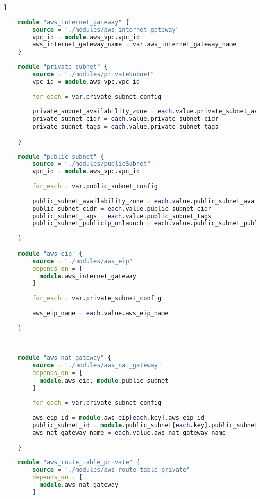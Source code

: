 \begin{lstlisting}[language=terraform]
    }
    
    module "aws_internet_gateway" {
        source = "./modules/aws_internet_gateway"
        vpc_id = module.aws_vpc.vpc_id
        aws_internet_gateway_name = var.aws_internet_gateway_name
    }
    
    module "private_subnet" {
        source = "./modules/privateSubnet"
        vpc_id = module.aws_vpc.vpc_id
    
        for_each = var.private_subnet_config
    
        private_subnet_availability_zone = each.value.private_subnet_availability_zone
        private_subnet_cidr = each.value.private_subnet_cidr
        private_subnet_tags = each.value.private_subnet_tags
      
    }
    
    module "public_subnet" {
        source = "./modules/publicSubnet"
        vpc_id = module.aws_vpc.vpc_id
    
        for_each = var.public_subnet_config
    
        public_subnet_availability_zone = each.value.public_subnet_availability_zone
        public_subnet_cidr = each.value.public_subnet_cidr
        public_subnet_tags = each.value.public_subnet_tags
        public_subnet_publicip_onlaunch = each.value.public_subnet_publicip_onlaunch
      
    }
    
    module "aws_eip" {
        source = "./modules/aws_eip"
        depends_on = [
          module.aws_internet_gateway   
        ]
    
        for_each = var.private_subnet_config
    
        aws_eip_name = each.value.aws_eip_name
      
    }
    
    
    
    module "aws_nat_gateway" {
        source = "./modules/aws_nat_gateway"
        depends_on = [
          module.aws_eip, module.public_subnet
        ]
    
        for_each = var.private_subnet_config
    
        aws_eip_id = module.aws_eip[each.key].aws_eip_id
        public_subnet_id = module.public_subnet[each.key].public_subnet_id
        aws_nat_gateway_name = each.value.aws_nat_gateway_name
    
    }
    
    module "aws_route_table_private" {
        source = "./modules/aws_route_table_private"
        depends_on = [
          module.aws_nat_gateway
        ]
    

\end{lstlisting}
